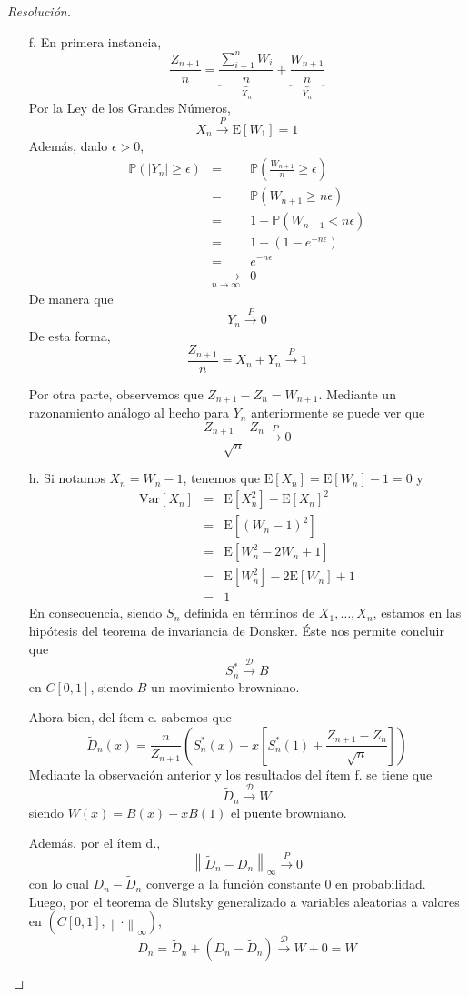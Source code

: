 \documentclass[a4paper,11pt]{article}
\newcommand{\abs}[1]{\ensuremath{\left\lvert #1 \right\rvert}}
\newcommand{\Exp}[1]{\ensuremath{\textrm{E}\left[#1\right]}}
\newcommand{\Prob}[1]{\ensuremath{\mathbb{P} \left( #1 \right)}}
\newcommand{\norm}[1]{\left\lVert#1\right\rVert}
\newcommand{\normi}[1]{\norm{#1}_{\infty}}
\newcommand{\Sst}[1]{S_n^{*}(#1)}
\begin{document}
\begin{proof}[Resoluci\'on]
\begin{enumerate}
    \item[f.] En primera instancia,
    $$\frac{Z_{n+1}}{n} = \underbrace{\frac{\sum_{i=1}^{n}{W_i}}{n}}_{X_n} + \underbrace{\frac{W_{n+1}}{n}}_{Y_n}$$
    Por la Ley de los Grandes Números,
    $$X_n \overset{P}{\longrightarrow} \Exp{W_1} = 1$$
    Además, dado $\epsilon > 0$,
    \begin{eqnarray*}
        \Prob{\abs{Y_n} \geq \epsilon} &=& \Prob{\frac{W_{n+1}}{n} \geq \epsilon} \\
            &=& \Prob{W_{n+1} \geq n \epsilon} \\
            &=& 1 - \Prob{W_{n+1} < n \epsilon} \\
            &=& 1 - \left(1 - e^{-n \epsilon}\right) \\
            &=& e^{-n \epsilon} \\
            &\underset{n \to \infty}{\longrightarrow}& 0
    \end{eqnarray*}
    De manera que
    $$Y_n \overset{P}{\longrightarrow} 0$$
    De esta forma,
    $$\frac{Z_{n+1}}{n} = X_n + Y_n \overset{P}{\longrightarrow} 1$$

    Por otra parte, observemos que $Z_{n+1} - Z_n = W_{n+1}$. Mediante un razonamiento análogo
    al hecho para $Y_n$ anteriormente se puede ver que 
    $$\frac{Z_{n+1} - Z_n}{\sqrt{n}} \overset{P}{\longrightarrow} 0$$

    \item[h.] 
    Si notamos $X_n = W_n - 1$, tenemos que $\Exp{X_n} = \Exp{W_n} - 1 = 0$ y
    \begin{eqnarray*}
       \text{Var}[X_n] &=& \Exp{X_n^2} - \Exp{X_n}^2 \\
            &=& \Exp{(W_n - 1)^2} \\
            &=& \Exp{W_n^2 - 2W_n + 1} \\
            &=& \Exp{W_n^2} - 2\Exp{W_n} + 1 \\
            &=& 1
    \end{eqnarray*}
    En consecuencia, siendo $S_n$ definida en términos de $X_1,\dots,X_n$, estamos en las hipótesis del teorema 
    de invariancia de Donsker. Éste nos permite concluir que
    $$S_n^{*} \overset{\mathcal{D}}{\longrightarrow} B$$
    en $C[0,1]$, siendo $B$ un movimiento browniano.

    Ahora bien, del ítem e. sabemos que 
    $$\tilde{D}_n(x) = \frac{n}{Z_{n+1}} \left(\Sst{x} - x \left[ \Sst{1} + \frac{Z_{n+1} - Z_n}{\sqrt{n}} \right] \right)$$
    Mediante la observación anterior y los resultados del ítem f. se tiene que
    $$\tilde{D}_n \overset{\mathcal{D}}{\longrightarrow} W$$
    siendo $W(x) = B(x) - xB(1)$ el puente browniano.

    Además, por el ítem d.,
    $$\normi{\tilde{D}_n - D_n} \overset{P}{\longrightarrow} 0$$
    con lo cual $D_n - \tilde{D}_n$ converge a la función constante 0 en probabilidad. Luego, por el teorema
    de Slutsky generalizado a variables aleatorias a valores en $(C[0,1], \normi{\cdot})$,
    $$D_n = \tilde{D}_n + (D_n - \tilde{D}_n) \overset{\mathcal{D}}{\longrightarrow} W + 0 = W$$
\end{enumerate}
\end{proof}
\end{document}
